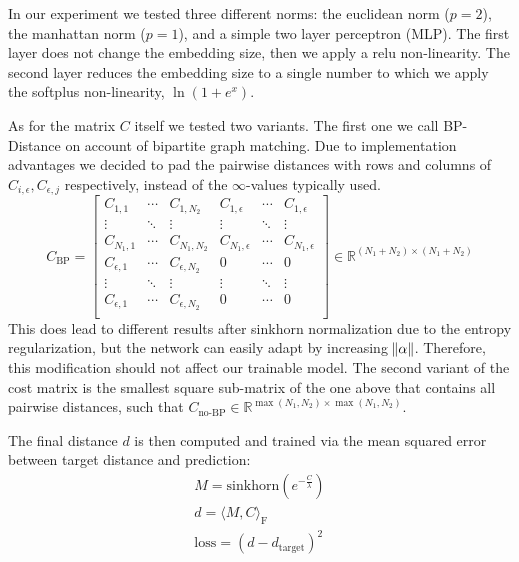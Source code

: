 In our experiment we tested three different norms: the euclidean norm ($p=2$), the manhattan norm ($p=1$), and a simple two layer perceptron (MLP). The first layer does not change the embedding size, then we apply a relu non-linearity. The second layer reduces the embedding size to a single number to which we apply the softplus non-linearity, $\ln(1 + e^x)$.

As for the matrix $C$ itself we tested two variants. The first one we call BP-Distance on account of bipartite graph matching. Due to implementation advantages we decided to pad the pairwise distances with rows and columns of $C_{i, \epsilon}, C_{\epsilon, j}$ respectively, instead of the $\infty$-values typically used.
\begin{equation}
     C_\text{BP}=
          \left[
          \begin{array}{ccc|ccc}
               C_{1,1} & \dotsi & C_{1, N_2} & C_{1, \epsilon} & \dotsi & C_{1, \epsilon} \\
               \vdots & \ddots & \vdots & \vdots & \ddots & \vdots \\
               C_{N_1, 1} & \dotsi & C_{N_1, N_2} & C_{N_1, \epsilon} & \dotsi & C_{N_1, \epsilon} \\
               \hline
               C_{\epsilon, 1} & \dotsi & C_{\epsilon, N_2} & 0 & \dotsi & 0 \\
               \vdots & \ddots & \vdots & \vdots & \ddots & \vdots \\
               C_{\epsilon, 1} & \dotsi & C_{\epsilon, N_2} & 0 & \dotsi & 0 \\
          \end{array}
          \right]
     \in \mathbb{R}^{(N_1 + N_2) \times (N_1 + N_2)}
\end{equation}
This does lead to different results after sinkhorn normalization due to the entropy regularization, but the network can easily adapt by increasing $\norm{\alpha}$. Therefore, this modification should not affect our trainable model. The second variant of the cost matrix is the smallest square sub-matrix of the one above that contains all pairwise distances, such that \mbox{$C_\text{no-BP} \in \mathbb{R}^{\max({N_1, N_2}) \times \max({N_1, N_2})}$}.

The final distance $d$ is then computed and trained via the mean squared error between target distance and prediction:
\begin{equation}
     \begin{gathered}
          M = \text{sinkhorn}(e^{-\frac{C}{\lambda}}) \\
          d = \langle M, C \rangle_\mathrm{F} \\
          \text{loss} = (d - d_\text{target})^2
     \end{gathered}
\end{equation}


